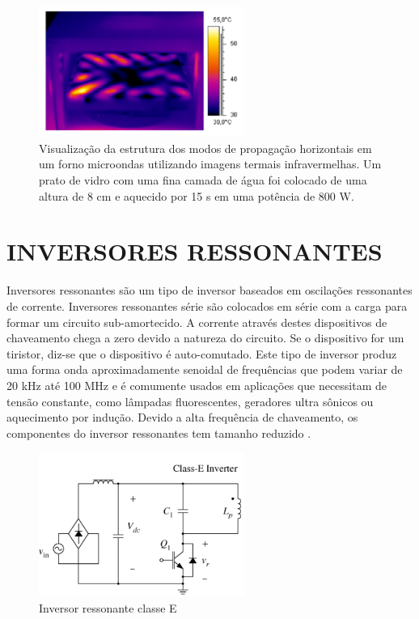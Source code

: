 \begin{figure}[!htb]
    \centering
    \includegraphics[width=0.6\textwidth]{./dados/figuras/micronodes}
    \caption{Visualização da estrutura dos modos de propagação horizontais em um forno microondas utilizando imagens termais infravermelhas. Um prato de vidro com uma fina camada de água foi colocado de uma altura de 8 cm e aquecido por 15 s em uma potência de 800 W.}
    \label{fig:figura-fontferro}
\end{figure}


\section{INVERSORES RESSONANTES}
\label{sec:inverter}

Inversores ressonantes são um tipo de inversor baseados em oscilações ressonantes de corrente.  Inversores ressonantes série são colocados em série com a carga para formar um circuito sub-amortecido. A corrente através destes dispositivos de chaveamento chega a zero devido a natureza do circuito. Se o dispositivo for um tiristor, diz-se que o dispositivo é auto-comutado. 
Este tipo de inversor produz uma forma onda aproximadamente senoidal de frequências que podem variar de 20 kHz até 100 MHz e é comumente usados em aplicações que necessitam de tensão constante, como lâmpadas fluorescentes, geradores ultra sônicos ou aquecimento por indução. Devido a alta frequência de chaveamento, os componentes do inversor ressonantes tem tamanho reduzido \cite{Rashid}.

\begin{figure}[!htb]
    \centering
    \includegraphics[width=0.6\textwidth]{./dados/figuras/inverter}
    \caption{Inversor ressonante classe E}
    \label{fig:figura-fontferro}
\end{figure}


